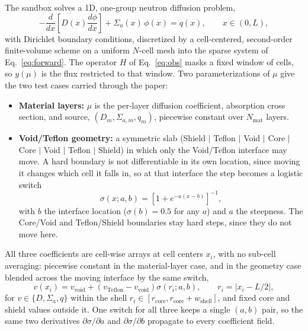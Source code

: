 \documentclass[]{ANStopical}
\begin{document}
The sandbox solves a 1D, one-group neutron diffusion problem,
\begin{equation}
    -\frac{d}{dx}\!\left[D(x)\frac{d\phi}{dx}\right] + \Sigma_a(x)\,\phi(x) = q(x),
    \qquad x\in(0,L),
    \label{eq:diffusion}
\end{equation}
with Dirichlet boundary conditions, discretized by a cell-centered, second-order finite-volume scheme on a uniform $N$-cell mesh into the sparse system of Eq.~\eqref{eq:forward}. The operator $H$ of Eq.~\eqref{eq:obs} masks a fixed window of cells, so $y(\mu)$ is the flux restricted to that window. Two parameterizations of $\mu$ give the two test cases carried through the paper:
\begin{itemize}
    \item \textbf{Material layers:} $\mu$ is the per-layer diffusion coefficient, absorption cross section, and source, $(D_m,\Sigma_{a,m},q_m)$, piecewise constant over $N_{\mathrm{mat}}$ layers.
    \item \textbf{Void/Teflon geometry:} a symmetric slab (Shield $\vert$ Teflon $\vert$ Void $\vert$ Core $\vert$ Core $\vert$ Void $\vert$ Teflon $\vert$ Shield) in which only the Void/Teflon interface may move. A hard boundary is not differentiable in its own location, since moving it changes which cell it falls in, so at that interface the step becomes a logistic switch
    \begin{equation}
        \sigma(x;a,b) = \left[1+e^{-a(x-b)}\right]^{-1},
        \label{eq:logistic}
    \end{equation}
    with $b$ the interface location ($\sigma(b)=0.5$ for any $a$) and $a$ the steepness. The Core/Void and Teflon/Shield boundaries stay hard steps, since they do not move here.
\end{itemize}

All three coefficients are cell-wise arrays at cell centers $x_i$, with no sub-cell averaging: piecewise constant in the material-layer case, and in the geometry case blended across the moving interface by the same switch,
\begin{equation}
    v(x_i) = v_{\mathrm{void}} + \left(v_{\mathrm{Teflon}}-v_{\mathrm{void}}\right)\sigma\!\left(r_i;a,b\right),
    \qquad r_i = \lvert x_i - L/2\rvert,
    \label{eq:blend}
\end{equation}
for $v\in\{D,\Sigma_a,q\}$ within the shell $r_i\in[r_{\mathrm{core}},r_{\mathrm{core}}+w_{\mathrm{shell}}]$, and fixed core and shield values outside it. One switch for all three keeps a single $(a,b)$ pair, so the same two derivatives $\partial\sigma/\partial a$ and $\partial\sigma/\partial b$ propagate to every coefficient field.
\end{document}
